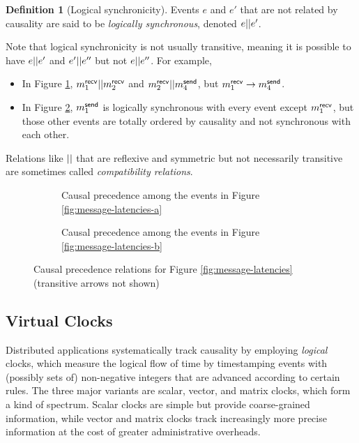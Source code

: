 \documentclass[]             %
{NASA}                       %
\theoremstyle{definition}
\newtheorem{definition}[theorem]{Definition}
\begin{document}
\begin{definition}[Logical synchronicity]
  \label{def:logically-synchronous}
  Events $e$ and $e'$ that are not related by causality are said to be
  \emph{logically synchronous}, denoted $e || e'$.
\end{definition}

Note that
logical synchronicity is not usually transitive, meaning it is
possible to have $e || e'$ and $e' || e''$ but not
$e || e''$. For example,
\begin{itemize}
\item In Figure \ref{fig:message-co-a}, $m_{1}^{\mathsf{recv}} || m_{2}^{\mathsf{recv}}$
  and $m_{2}^{\mathsf{recv}} || m_{4}^{\mathsf{send}}$, but $m_{1}^{\mathsf{recv}} \to m_{4}^{\mathsf{send}}$.
\item In Figure \ref{fig:message-co-b}, $m_{1}^{\mathsf{send}}$ is logically synchronous
with every event except $m_{1}^{\mathsf{recv}}$, but those other events are
totally ordered by causality and not synchronous with each
other.
\end{itemize}

Relations like $||$ that are reflexive and symmetric but not
necessarily transitive are sometimes called \emph{compatibility
  relations}.

\begin{figure}
  \begingroup
  \setlength\belowcaptionskip{4ex}
  \begin{subfigure}{1\textwidth}
    \centering
    
    \caption{Causal precedence among the events in Figure \ref{fig:message-latencies-a}}
    \label{fig:message-co-a}
  \end{subfigure}
  \endgroup
  \begin{subfigure}{1\textwidth}
    \centering
    
    \caption{Causal precedence among the events in Figure \ref{fig:message-latencies-b}}
    \label{fig:message-co-b}
  \end{subfigure}
  \caption{Causal precedence relations for Figure \ref{fig:message-latencies} (transitive arrows not shown)}
  \label{fig:causal-precedence}
\end{figure}

\subsection{Virtual Clocks}
\label{ssec:timestamps}
Distributed applications systematically track causality by employing
\emph{logical} clocks, which measure the logical flow of time by
timestamping events with (possibly sets of) non-negative integers that
are advanced according to certain rules. The three major variants are
scalar, vector, and matrix clocks, which form a kind of
spectrum. Scalar clocks are simple but provide coarse-grained
information, while vector and matrix clocks track increasingly more
precise information at the cost of greater administrative overheads.
\end{document}
